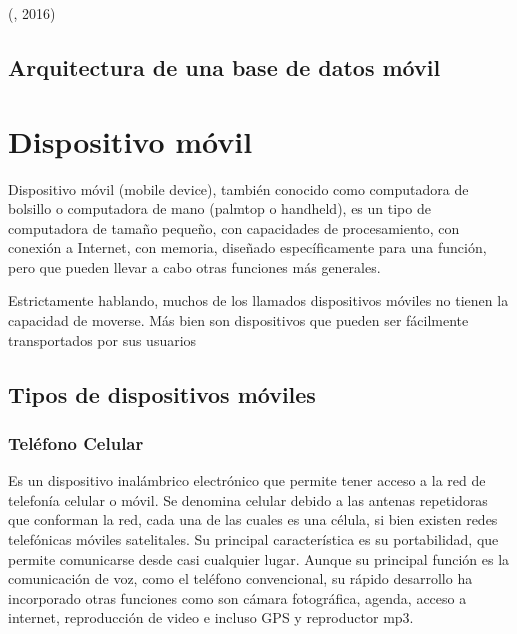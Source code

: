 (\citet{sqlserverce2bib}, 2016)

\subsection{Arquitectura de una base de datos móvil} 




\section{Dispositivo móvil}
\setlength{\parskip}{5mm}
Dispositivo móvil (mobile device), también conocido como computadora de bolsillo o computadora de mano (palmtop o handheld), es un tipo de computadora de tamaño pequeño, con capacidades de procesamiento, con conexión a Internet, con memoria, diseñado específicamente para una función, pero que pueden llevar a cabo otras funciones más generales.

Estrictamente hablando, muchos de los llamados dispositivos móviles no tienen la capacidad de moverse. Más bien son dispositivos que pueden ser fácilmente transportados por sus usuarios
\setlength{\parskip}{0mm}


\subsection{Tipos de dispositivos móviles}

\subsubsection{Teléfono Celular} 
\setlength{\parskip}{5mm}
Es un dispositivo inalámbrico electrónico que permite tener acceso a la red de telefonía celular o móvil. Se denomina celular debido a las antenas repetidoras que conforman la red, cada una de las cuales es una célula, si bien existen redes telefónicas móviles satelitales. Su principal característica es su portabilidad, que permite comunicarse desde casi cualquier lugar. Aunque su principal función es la comunicación de voz, como el teléfono convencional, su rápido desarrollo ha incorporado otras funciones como son cámara fotográfica, agenda, acceso a internet, reproducción de video e incluso GPS y reproductor mp3.

